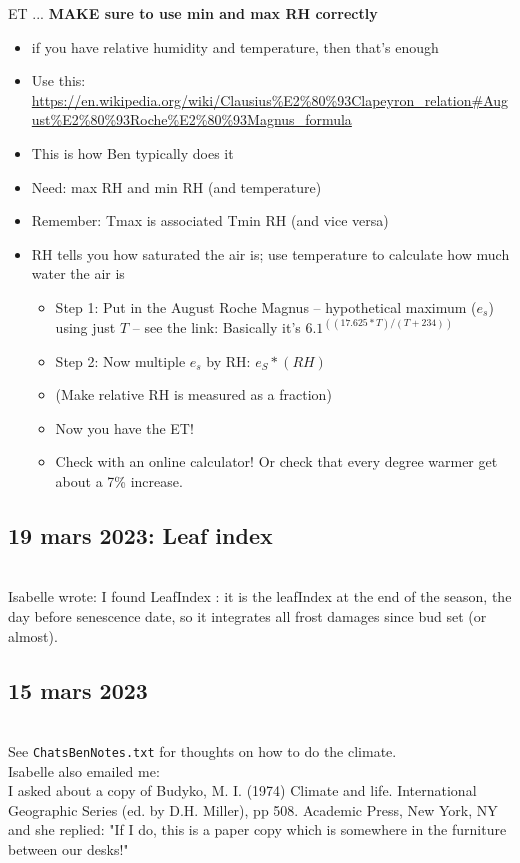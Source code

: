 \documentclass[11pt,letter]{article}
\begin{document}
ET ... {\bf MAKE sure to use min and max RH correctly}
\begin{itemize}
	\item if you have relative humidity and temperature, then that's enough 
	\item Use this: \url{https://en.wikipedia.org/wiki/Clausius%E2%80%93Clapeyron_relation#August%E2%80%93Roche%E2%80%93Magnus_formula}
	\item This is how Ben typically does it
	\item Need: max RH and min RH (and temperature)
	\item Remember: Tmax is associated Tmin RH (and vice versa)
	\item RH tells you how saturated the air is; use temperature to calculate how much water the air is
	\begin{itemize}
	\item Step 1: Put in the August Roche Magnus -- hypothetical maximum ($e_s$) using just $T$ -- see the link: Basically it's $6.1 ^{((17.625*T)/(T+234))}$
\item Step 2: Now multiple $e_s$ by RH: $e_S*(RH)$
\item (Make relative RH is measured as a fraction)
\item Now you have the ET!
\item Check with an online calculator! Or check that every degree warmer get about a 7\% increase. 
	\end{itemize}
	\end{itemize}

\subsection{19 mars 2023: Leaf index}\\

Isabelle wrote: I found LeafIndex : it is the leafIndex at the end of the season, the day before senescence date, so it integrates all frost damages since bud set (or almost).

\subsection{15 mars 2023}\\

See \verb|ChatsBenNotes.txt| for thoughts on how to do the climate.\\

Isabelle also emailed me:\\
I asked about a copy of Budyko, M. I. (1974) Climate and life. International Geographic Series (ed. by D.H. Miller), pp 508. Academic Press, New York, NY and she replied: "If I do, this is a paper copy which is somewhere in the furniture between our desks!"\\
\end{document}
